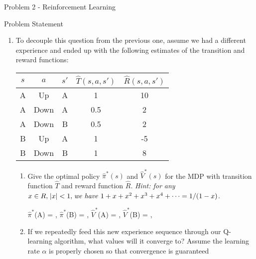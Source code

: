 \begin{problem}{Problem 2 - Reinforcement Learning}
\begin{statement}{Problem Statement}
\begin{enumerate}[label=(\alph*)]
\begin{center}
            \end{center}
            \item To decouple this question from the previous one, assume we had a different experience and ended up with the following estimates of the transition and reward functions:
            \begin{center}
                \begin{tabular}[ht]{|c|c|c|c|c|}
                    \hline $s$ & $a$ & $s'$ & $\hat{T}(s, a, s')$ & $\hat{R}(s, a, s')$ \\ \hline
                    A & Up & A & 1 & 10 \\ \hline
                    A & Down & A & 0.5 & 2 \\ \hline
                    A & Down & B & 0.5 & 2 \\ \hline
                    B & Up & A & 1 & -5 \\ \hline
                    B & Down & B & 1 & 8 \\ \hline
                \end{tabular}
            \end{center}
            \begin{enumerate}[label=(\roman*)]
                \item Give the optimal policy $\hat{\pi}^{*}(s)$ and $\hat{V}^{*}(s)$ for the MDP with transition function $\hat{T}$ and reward function $\hat{R}$. \textit{Hint: for any} $x \in R, \hspace*{1pt} |x| < 1, \hspace*{1pt} \text{\textit{we have} } 1 + x + x^{2} + x^{3} + x^{4} + \dots = 1 /(1 - x)$.
                \begin{center}
                    $\hat{\pi}^{*}$(A) = \underline{\hspace*{1cm}}, \hspace*{2pt} $\hat{\pi}^{*}$(B) = \underline{\hspace*{1cm}}, \hspace*{2pt} $\hat{V}^{*}$(A) = \underline{\hspace*{1cm}}, \hspace*{2pt} $\hat{V}^{*}$(B) = \underline{\hspace*{1cm}}, \hspace*{2pt}
                \end{center}
                \item If we repeatedly feed this new experience sequence through our Q-learning algorithm, what values will it converge to? Assume the learning rate $\alpha$ is properly chosen so that convergence is guaranteed

\end{enumerate}
\end{enumerate}
\end{statement}
\end{problem}
